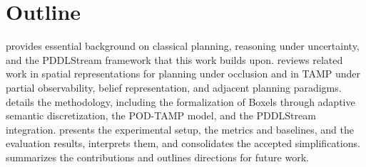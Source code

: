 \section{Outline}
 provides essential background on classical planning, reasoning under uncertainty, and the PDDLStream framework that this work builds upon.  reviews related work in spatial representations for planning under occlusion and in TAMP under partial observability, belief representation, and adjacent planning paradigms.  details the methodology, including the formalization of Boxels through adaptive semantic discretization, the POD-TAMP model, and the PDDLStream integration.  presents the experimental setup, the metrics and baselines, and the evaluation results, interprets them, and consolidates the accepted simplifications.  summarizes the contributions and outlines directions for future work.
